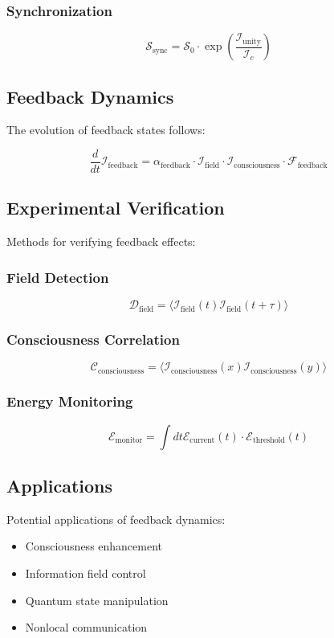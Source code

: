 \subsubsection{Synchronization}
\[
\mathcal{S}_{\text{sync}} = \mathcal{S}_0 \cdot \exp\left(\frac{\mathcal{I}_{\text{unity}}}{\mathcal{I}_c}\right)
\]

\subsection{Feedback Dynamics}

The evolution of feedback states follows:

\[
\frac{d}{dt}\mathcal{I}_{\text{feedback}} = \alpha_{\text{feedback}} \cdot \mathcal{I}_{\text{field}} \cdot \mathcal{I}_{\text{consciousness}} \cdot \mathcal{F}_{\text{feedback}}
\]

\subsection{Experimental Verification}

Methods for verifying feedback effects:

\subsubsection{Field Detection}
\[
\mathcal{D}_{\text{field}} = \langle \mathcal{I}_{\text{field}}(t)\mathcal{I}_{\text{field}}(t+\tau)\rangle
\]

\subsubsection{Consciousness Correlation}
\[
\mathcal{C}_{\text{consciousness}} = \langle \mathcal{I}_{\text{consciousness}}(x)\mathcal{I}_{\text{consciousness}}(y)\rangle
\]

\subsubsection{Energy Monitoring}
\[
\mathcal{E}_{\text{monitor}} = \int dt \mathcal{E}_{\text{current}}(t) \cdot \mathcal{E}_{\text{threshold}}(t)
\]

\subsection{Applications}

Potential applications of feedback dynamics:

\begin{itemize}
    \item Consciousness enhancement
    \item Information field control
    \item Quantum state manipulation
    \item Nonlocal communication
\end{itemize} 
